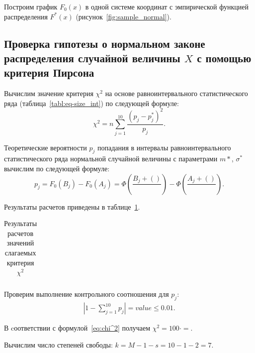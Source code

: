 \documentclass[14pt,hidelinks]{extarticle}
\begin{document}
Построим график $F_0(x)$ в одной системе координат с эмпирической функцией распределения $F^*(x)$ (рисунок~\ref{fig:sample_normal}). 

\newpage

\subsection{Проверка гипотезы о нормальном законе распределения 
  случайной величины $ X $ с помощью критерия Пирсона}

Вычислим значение критерия $\chi^2$ на основе равноинтервального статистического ряда
(таблица~\ref{tabl:eq-size_int}) по следующей формуле:
\begin{equation}
  \label{eq:chi^2}
	\chi^2 = n \sum_{j=1}^{10} \frac{(p_j-p^*_j)^2}{p_j}.
\end{equation}

Теоретические вероятности $p_j$ попадания в интервалы равноинтервального статистического ряда нормальной случайной величины с параметрами $m*$, $\sigma^*$ вычислим по следующей формуле:
\begin{equation*}
  p_j = F_0(B_j) - F_0(A_j) = \Phi \left( \frac{B_j + ()}{} \right) - \Phi \left( \frac{A_j + ()}{} \right).
\end{equation*}

Результаты расчетов приведены в таблице~\ref{tabl:pirson}.

\begin{table}[h!]
  \renewcommand{\arraystretch}{1.2}
  \renewcommand{\tabcolsep}{1.2em}
  \caption{Результаты расчетов значений слагаемых критерия $ \chi^2 $\label{tabl:pirson}}
  \centering
  \small
  \begin{tabular}{|c|c|c|c|c|c|c|c|}
    \hline
    
  \end{tabular}
\end{table}

Проверим выполнение контрольного соотношения для $p_j$:
\begin{align}
	\left| 1 - \sum_{j=1}^{10} p_j \right| = value \le 0.01.
\end{align}

В cоответствии с формулой~\eqref{eq:chi^2} получаем $\chi^2= 100 \cdot  =  $.

Вычислим число степеней свободы: $ k = M - 1 - s = 10 - 1 - 2 = 7 $. 
\end{document}
